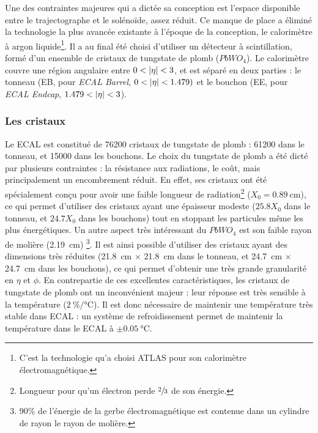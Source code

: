 Une des contraintes majeures qui a dictée sa conception est l'espace disponible entre le trajectographe et le solénoïde, assez réduit. Ce manque de place a éliminé la technologie la plus avancée existante à l'époque de la conception, le calorimètre à argon liquide\footnote{C'est la technologie qu'a choisi ATLAS pour son calorimètre électromagnétique.}. Il a au final été choisi d'utiliser un détecteur à scintillation, formé d'un ensemble de cristaux de tungstate de plomb ($PbWO_4$). Le calorimètre couvre une région angulaire entre $0 < \lvert \eta \rvert < 3$, et est séparé en deux parties : le tonneau (EB, pour \emph{ECAL Barrel}, $0 < \lvert \eta \rvert < \num{1.479})$ et le bouchon (EE, pour \emph{ECAL Endcap}, $\num{1.479} < \lvert \eta \rvert < 3$).

\subsubsection{Les cristaux}

Le ECAL est constitué de 76200 cristaux de tungstate de plomb : 61200 dans le tonneau, et 15000 dans les bouchons. Le choix du tungstate de plomb a été dicté par plusieurs contraintes : la résistance aux radiations, le coût, mais principalement un encombrement réduit. En effet, ses cristaux ont été spécialement conçu pour avoir une faible longueur de radiation\footnote{Longueur pour qu'un électron perde $\sfrac{2}{3}$ de son énergie.} ($X_0 = \SI{0.89}{\cm}$), ce qui permet d'utiliser des cristaux ayant une épaisseur modeste ($\num{25.8}X_0$ dans le tonneau, et $\num{24.7}X_0$ dans les bouchons) tout en stoppant les particules même les plus énergétiques. Un autre aspect très intéressant du $PbWO_4$ est son faible rayon de molière (\SI{2.19}{\cm}) \footnote{90\% de l'énergie de la gerbe électromagnétique est contenue dans un cylindre de rayon le rayon de molière.}. Il est ainsi possible d'utiliser des cristaux ayant des dimensions très réduites (\SI{21.8}{\cm} $\times$ \SI{21.8}{\cm} dans le tonneau, et \SI{24.7}{\cm} $\times$ \SI{24.7}{\cm} dans les bouchons), ce qui permet d'obtenir une très grande granularité en $\eta$ et $\phi$.
En contrepartie de ces excellentes caractéristiques, les cristaux de tungstate de plomb ont un inconvénient majeur : leur réponse est très sensible à la température (\tilde $\SI[per-mode = symbol]{2}{\percent\per\degreeCelsius}$). Il est donc nécessaire de maintenir une température très stable dans ECAL : un système de refroidissement permet de maintenir la température dans le ECAL à $\pm \SI{0.05}{\degreeCelsius}$.


